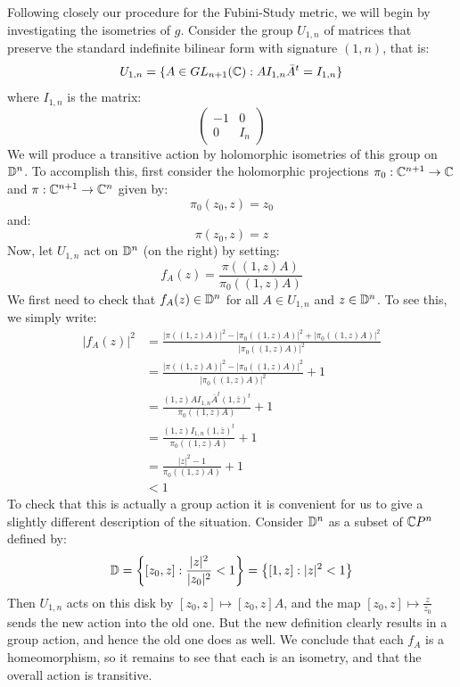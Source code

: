 Following closely our procedure for the Fubini-Study metric, we will begin by investigating the isometries of $g$.  Consider the group $U_{1,n}$ of matrices that preserve the standard indefinite bilinear form with signature $(1,n)$, that is:
%
$$ U_{1,n} = \{ A \in GL_{n+1}( \mathbb{C} ) : A I_{1,n} \bar{A}^{t} = I_{1,n} \} $$
%
where $I_{1,n}$ is the matrix:
%
$$ \left( \begin{array}{cc} -1 & 0 \\ 0 & I_n \end{array} \right) $$
%
We will produce a transitive action by holomorphic isometries of this group on $\mathbb{D}^n$.  To accomplish this, first consider the holomorphic projections $\pi_0 : \mathbb{C}^{n+1} \rightarrow \mathbb{C} $ and $ \pi : \mathbb{C}^{n+1} \rightarrow \mathbb{C}^{n} $ given by:
%
$$ \pi_0 ( z_0, z ) = z_0 $$
%
and:
%
$$ \pi ( z_0, z ) = z $$
%
Now, let $U_{1,n}$ act on $\mathbb{D}^n$ (on the right) by setting:
%
$$ f_A (z) = \frac{ \pi( (1,z)A ) }{ \pi_0 ( (1,z)A ) } $$
%
We first need to check that $f_A (z) \in \mathbb{D}^n$ for all $A \in U_{1,n}$ and $z \in \mathbb{D}^n$.  To see this, we simply write:
%
\begin{align*}
|f_A (z)|^2 &= \frac{ |\pi( (1,z)A )|^2 - |\pi_0 ( (1,z)A )|^2 + |\pi_0 ( (1,z)A )|^2 }{ |\pi_0 ( (1,z)A )|^2 } \\
&= \frac{ |\pi( (1,z)A )|^2 - |\pi_0 ( (1,z)A )|^2 }{ |\pi_0 ( (1,z)A )|^2 } + 1 \\
&= \frac{ (1,z)A I_{1,n} \bar{A}^{t} (1, \bar{z})^{t} }{ \pi_0 ( (1,z)A ) } + 1 \\
&= \frac{ (1,z) I_{1,n} (1, \bar{z} )^{t} }{ \pi_0 ( (1,z)A ) } + 1\\
&= \frac{ |z|^2 - 1  }{ \pi_0 ( (1,z)A ) } + 1 \\
&< 1
\end{align*}
%
To check that this is actually a group action it is convenient for us to give a slightly different description of the situation.  Consider $\mathbb{D}^n$ as a subset of $\mathbb{C}P^n$ defined by:
%
\begin{align*} \mathbb{D} = \left\{ [z_0, z] : \frac{ |z|^2 }{ |z_0|^2 } < 1 \right\} = \left\{ [1,z] : |z|^2 < 1 \right\}
\end{align*}
%
Then $U_{1,n}$ acts on this disk by $[z_0, z] \mapsto [z_0, z]A$, and the map $[z_0, z] \mapsto \frac{z}{z_0}$ sends the new action into the old one.  But the new definition clearly results in a group action, and hence the old one does as well.  We conclude that each $f_A$ is a homeomorphism, so it remains to see that each is an isometry, and that the overall action is transitive.

